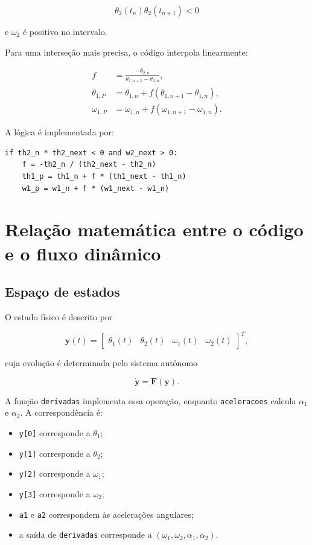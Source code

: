 \documentclass[12pt,a4paper]{article}
\begin{document}
\begin{equation}
\theta_2(t_n)\theta_2(t_{n+1})<0
\end{equation}

e $\omega_2$ é positivo no intervalo.

Para uma interseção mais precisa, o código interpola linearmente:

\begin{align}
f&=\frac{-\theta_{2,n}}{\theta_{2,n+1}-\theta_{2,n}},\\
\theta_{1,P}&=\theta_{1,n}+f(\theta_{1,n+1}-\theta_{1,n}),\\
\omega_{1,P}&=\omega_{1,n}+f(\omega_{1,n+1}-\omega_{1,n}).
\end{align}

A lógica é implementada por:

\begin{lstlisting}
if th2_n * th2_next < 0 and w2_next > 0:
    f = -th2_n / (th2_next - th2_n)
    th1_p = th1_n + f * (th1_next - th1_n)
    w1_p = w1_n + f * (w1_next - w1_n)
\end{lstlisting}

\section{Relação matemática entre o código e o fluxo dinâmico}

\subsection{Espaço de estados}

O estado físico é descrito por

\begin{equation}
\mathbf{y}(t)=
\begin{bmatrix}
\theta_1(t)&\theta_2(t)&\omega_1(t)&\omega_2(t)
\end{bmatrix}^{T},
\end{equation}

cuja evolução é determinada pelo sistema autônomo

\begin{equation}
\dot{\mathbf{y}}=\mathbf{F}(\mathbf{y}).
\end{equation}

A função \texttt{derivadas} implementa essa operação, enquanto \texttt{aceleracoes} calcula $\alpha_1$ e $\alpha_2$. A correspondência é:

\begin{itemize}
    \item \texttt{y[0]} corresponde a $\theta_1$;
    \item \texttt{y[1]} corresponde a $\theta_2$;
    \item \texttt{y[2]} corresponde a $\omega_1$;
    \item \texttt{y[3]} corresponde a $\omega_2$;
    \item \texttt{a1} e \texttt{a2} correspondem às acelerações angulares;
    \item a saída de \texttt{derivadas} corresponde a $(\omega_1,\omega_2,\alpha_1,\alpha_2)$.
\end{itemize}
\end{document}
